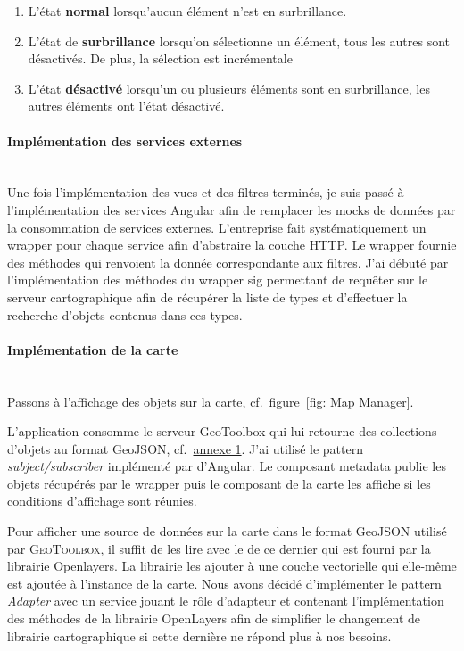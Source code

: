 \documentclass{rapportUHA40}
\begin{document}
\begin{enumerate}
  \item L'état \textbf{normal} lorsqu'aucun élément n'est en surbrillance.
  \item L'état de \textbf{surbrillance} lorsqu'on sélectionne un élément, tous les
        autres sont désactivés. De plus, la sélection est incrémentale
  \item L'état \textbf{désactivé} lorsqu'un ou plusieurs éléments sont en surbrillance,
        les autres éléments ont l'état désactivé.
\end{enumerate}

\paragraph{Implémentation des services externes}\mbox{}\\
Une fois l'implémentation des vues et des filtres terminés, je suis passé à
l'implémentation des services Angular afin de remplacer les mocks de données
par la consommation de services externes. L'entreprise fait systématiquement un
\gls{wrapper} pour chaque service afin d'abstraire la couche HTTP\@. Le wrapper
fournie des méthodes qui renvoient la donnée correspondante aux filtres. J'ai
débuté par l'implémentation des méthodes du \gls{wrapper} \gls{sig} permettant
de requêter sur le serveur cartographique afin de récupérer la liste de types
et d'effectuer la recherche d'objets contenus dans ces types. \\

\paragraph{Implémentation de la carte}\mbox{}\\
Passons à l'affichage des objets sur la carte, cf.\ figure~\ref{fig: Map Manager}.


L'application consomme le serveur GeoToolbox qui lui retourne des collections
d'objets au format GeoJSON, cf.\ \hyperlink{ANNEX1}{annexe 1}. J'ai utilisé le
pattern \textit{subject/subscriber} implémenté par d'Angular. Le composant
metadata publie les objets récupérés par le wrapper puis le composant de la
carte les affiche si les conditions d'affichage sont réunies.

Pour afficher une source de données sur la carte dans le format GeoJSON utilisé
par \textsc{GeoToolbox}, il suffit de les lire avec le  \fg{} de ce
dernier qui est fourni par la librairie Openlayers. La librairie les ajouter à
une couche vectorielle qui elle-même est ajoutée à l'instance de la carte. Nous
avons décidé d'implémenter le pattern \textit{Adapter} avec un service jouant
le rôle d'adapteur et contenant l'implémentation des méthodes de la librairie
OpenLayers afin de simplifier le changement de librairie cartographique si
cette dernière ne répond plus à nos besoins.
\end{document}
